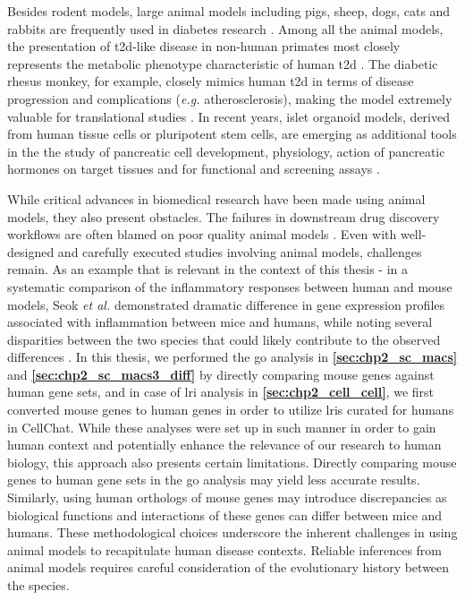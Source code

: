 \par Besides rodent models, large animal models including pigs, sheep, dogs, cats and rabbits are frequently used in diabetes research \textbf{\cite{cefalu_animal_2006,lutz_mammalian_2023,singh_animal_2024,covington_animal_2024}}. Among all the animal models, the presentation of \gls{t2d}-like disease in non-human primates most closely represents the metabolic phenotype characteristic of human \gls{t2d} \textbf{\cite{lutz_mammalian_2023,cefalu_animal_2006}}. The diabetic rhesus monkey, for example, closely mimics human \gls{t2d} in terms of disease progression and complications (\textit{e.g.} atherosclerosis), making the model extremely valuable for translational studies \textbf{\cite{singh_animal_2024}}. In recent years, islet organoid models, derived from human tissue cells or pluripotent stem cells, are emerging as additional tools in the the study of pancreatic cell development, physiology, action of pancreatic hormones on target tissues and for functional and screening assays \textbf{\cite{beydag-tasoz_towards_2023,zhang_islet_2022}}.\\

\par While critical advances in biomedical research have been made using animal models, they also present obstacles. The failures in downstream drug discovery workflows are often blamed on poor quality animal models \textbf{\cite{mcmurray_mouse_2011}}. Even with well-designed and carefully executed studies involving animal models, challenges remain. As an example that is relevant in the context of this thesis - in a systematic comparison of the inflammatory responses between human and mouse models, Seok \textit{et al.} demonstrated dramatic difference in gene expression profiles associated with inflammation between mice and humans, while noting several disparities between the two species that could likely contribute to the observed differences \textbf{\cite{bolker_animal_2017, seok_genomic_2013}}. In this thesis, we performed the \gls{go} analysis in \textbf{\autoref{sec:chp2_sc_macs}} and \textbf{\autoref{sec:chp2_sc_macs3_diff}} by directly comparing mouse genes against human gene sets, and in case of \gls{lri} analysis in \textbf{\autoref{sec:chp2_cell_cell}}, we first converted mouse genes to human genes in order to utilize \glspl{lri} curated for humans in CellChat. While these analyses were set up in such manner in order to gain human context and potentially enhance the relevance of our research to human biology, this approach also presents certain limitations. Directly comparing mouse genes to human gene sets in the \gls{go} analysis may yield less accurate results. Similarly, using human orthologs of mouse genes may introduce discrepancies as biological functions and interactions of these genes can differ between mice and humans. These methodological choices underscore the inherent challenges in using animal models to recapitulate human disease contexts. Reliable inferences from animal models requires careful consideration of the evolutionary history between the species.\\


